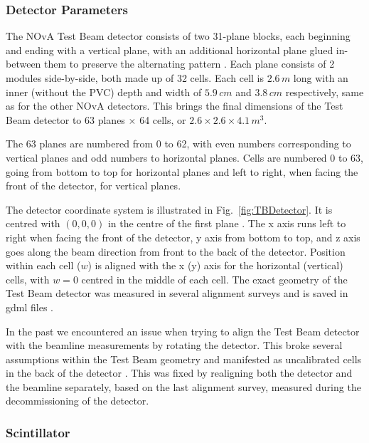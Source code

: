 \subsubsection*{Detector Parameters}
The \gls{NOvA} Test Beam detector consists of two 31-plane blocks, each beginning and ending with a vertical plane, with an additional horizontal plane glued in-between them to preserve the alternating pattern \cite{NOvA-doc-29543}. Each plane consists of 2 modules side-by-side, both made up of 32 cells. Each cell is $2.6\,\unit{m}$ long with an inner (without the PVC) depth and width of $5.9\,\unit{cm}$ and $3.8\,\unit{cm}$ respectively, same as for the other \gls{NOvA} detectors. This brings the final dimensions of the Test Beam detector to 63 planes $\times$ 64 cells, or $2.6\times 2.6\times 4.1\,\unit{m^3}$.

The 63 planes are numbered from 0 to 62, with even numbers corresponding to vertical planes and odd numbers to horizontal planes. Cells are numbered 0 to 63, going from bottom to top for horizontal planes and left to right, when facing the front of the detector, for vertical planes.

The detector coordinate system is illustrated in Fig.~\ref{fig:TBDetector}. It is centred with $\left(0,0,0\right)$ in the centre of the first plane \cite{NOvA-doc-58388}. The x axis runs left to right when facing the front of the detector, y axis from bottom to top, and z axis goes along the beam direction from front to the back of the detector. Position within each cell ($w$) is aligned with the x (y) axis for the horizontal (vertical) cells, with $w=0$ centred in the middle of each cell. The exact geometry of the Test Beam detector was measured in several alignment surveys and is saved in gdml files \cite{NOvA-doc-57955}.

In the past we encountered an issue when trying to align the Test Beam detector with the beamline measurements by rotating the detector. This broke several assumptions within the Test Beam geometry \cite{NOvA-doc-58388} and manifested as uncalibrated cells in the back of the detector \cite{NOvA-doc-57516}. This was fixed by realigning both the detector and the beamline separately, based on the last alignment survey, measured during the decommissioning of the detector.


\subsubsection*{Scintillator}

